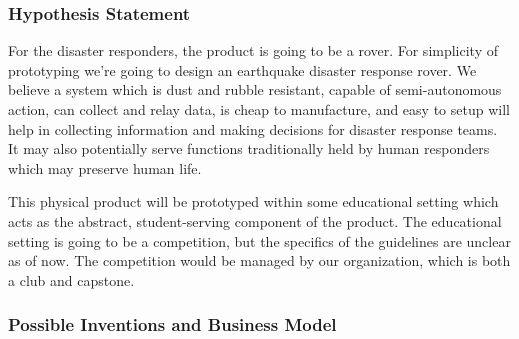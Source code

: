 \documentclass[a4paper, 10pt]{article}
\begin{document}
		\subsubsection{Hypothesis Statement}
		For the disaster responders, the product is going to be a rover. For simplicity of prototyping we're going to design an earthquake disaster response rover. We believe a system which is dust and rubble resistant, capable of semi-autonomous action, can collect and relay data, is cheap to manufacture, and easy to setup will help in collecting information and making decisions for disaster response teams. It may also potentially serve functions traditionally held by human responders which may preserve human life.
		
        This physical product will be prototyped within some educational setting which acts as the abstract, student-serving component of the product. The educational setting is going to be a competition, but the specifics of the guidelines are unclear as of now. The competition would be managed by our organization, which is both a club and capstone. 

		\subsubsection{Possible Inventions and Business Model}
\end{document}
